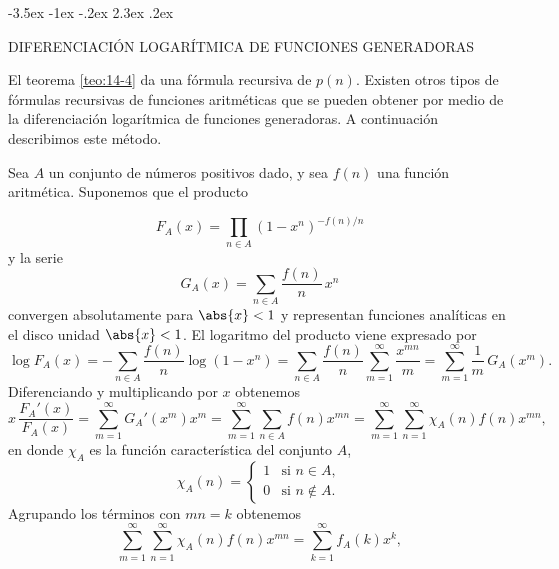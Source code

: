 \documentclass[12pt,a4paper]{book}
\makeatletter
\renewcommand\section{\@startsection{section}{1}{\z@}%
  {-3.5ex \@plus -1ex \@minus -.2ex}%
  {2.3ex \@plus .2ex}%
  {\normalfont\Large\bfseries\raggedright}}
\makeatother
\begin{document}
    \section{DIFERENCIACIÓN LOGARÍTMICA DE FUNCIONES GENERADORAS}

    El teorema \ref{teo:14-4} da una fórmula recursiva de $p(n)$. Existen otros tipos de
    fórmulas recursivas de funciones aritméticas que se pueden obtener por medio de la
    diferenciación logarítmica de funciones generadoras. A continuación describimos este método.

    Sea $A$ un conjunto de números positivos dado, y sea $f(n)$ una función aritmética.
    Suponemos que el producto

    \begin{equation*}
        F_{A}(x)=\prod_{n\in A}(1-x^{n})^{-f(n)/n}
    \end{equation*}
    y la serie
    \begin{equation*}
        G_{A}(x)=\sum_{n\in A}\frac{f(n)}{n}\,x^{n}
    \end{equation*}
    convergen absolutamente para $\abs{x}<1$ y representan funciones analíticas en el disco
    unidad $\abs{x}<1$. El logaritmo del producto viene expresado por
    \begin{equation*}
        \log F_{A}(x)=-\sum_{n\in A}\frac{f(n)}{n}\log(1-x^{n})=\sum_{n\in A}\frac{f(n)}{n}\sum_{m=1}^{\infty}\frac{x^{mn}}{m}=\sum_{m=1}^{\infty}\frac{1}{m}\,G_{A}(x^{m}).
    \end{equation*}
    Diferenciando y multiplicando por $x$ obtenemos
    \begin{equation*}
        x\,\frac{F_{A}'(x)}{F_{A}(x)}=\sum_{m=1}^{\infty}G_{A}'(x^{m})x^{m}=\sum_{m=1}^{\infty}\sum_{n\in A}f(n)x^{mn}=\sum_{m=1}^{\infty}\sum_{n=1}^{\infty}\chi_{A}(n)f(n)x^{mn},
    \end{equation*}
    en donde $\chi_{A}$ es la función característica del conjunto $A$,
    \begin{equation*}
        \chi_{A}(n)=
        \begin{cases}
            1&\text{si }n\in A,\\
            0&\text{si }n\notin A.
        \end{cases}
    \end{equation*}
    Agrupando los términos con $mn=k$ obtenemos
    \begin{equation*}
        \sum_{m=1}^{\infty}\sum_{n=1}^{\infty}\chi_{A}(n)f(n)x^{mn}=\sum_{k=1}^{\infty}f_{A}(k)x^{k},
    \end{equation*}
\end{document}

